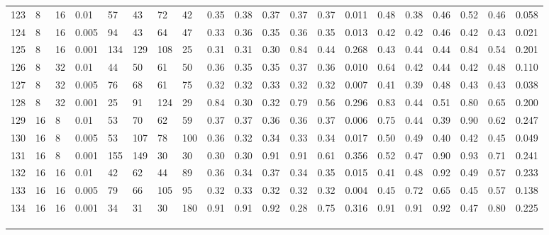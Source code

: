 \begin{landscape}
\begin{longtable}{llllllllllllllllllll}
123 & 8  & 16 & 0.01  & 57  & 43  & 72  & 42  & 0.35 & 0.38 & 0.37 & 0.37 & 0.37 & 0.011 & 0.48 & 0.38 & 0.46 & 0.52 & 0.46 & 0.058 \\
124 & 8  & 16 & 0.005 & 94  & 43  & 64  & 47  & 0.33 & 0.36 & 0.35 & 0.36 & 0.35 & 0.013 & 0.42 & 0.42 & 0.46 & 0.42 & 0.43 & 0.021 \\
125 & 8  & 16 & 0.001 & 134 & 129 & 108 & 25  & 0.31 & 0.31 & 0.30 & 0.84 & 0.44 & 0.268 & 0.43 & 0.44 & 0.44 & 0.84 & 0.54 & 0.201 \\
126 & 8  & 32 & 0.01  & 44  & 50  & 61  & 50  & 0.36 & 0.35 & 0.35 & 0.37 & 0.36 & 0.010 & 0.64 & 0.42 & 0.44 & 0.42 & 0.48 & 0.110 \\
127 & 8  & 32 & 0.005 & 76  & 68  & 61  & 75  & 0.32 & 0.32 & 0.33 & 0.32 & 0.32 & 0.007 & 0.41 & 0.39 & 0.48 & 0.43 & 0.43 & 0.038 \\
128 & 8  & 32 & 0.001 & 25  & 91  & 124 & 29  & 0.84 & 0.30 & 0.32 & 0.79 & 0.56 & 0.296 & 0.83 & 0.44 & 0.51 & 0.80 & 0.65 & 0.200 \\
129 & 16 & 8  & 0.01  & 53  & 70  & 62  & 59  & 0.37 & 0.37 & 0.36 & 0.36 & 0.37 & 0.006 & 0.75 & 0.44 & 0.39 & 0.90 & 0.62 & 0.247 \\
130 & 16 & 8  & 0.005 & 53  & 107 & 78  & 100 & 0.36 & 0.32 & 0.34 & 0.33 & 0.34 & 0.017 & 0.50 & 0.49 & 0.40 & 0.42 & 0.45 & 0.049 \\
131 & 16 & 8  & 0.001 & 155 & 149 & 30  & 30  & 0.30 & 0.30 & 0.91 & 0.91 & 0.61 & 0.356 & 0.52 & 0.47 & 0.90 & 0.93 & 0.71 & 0.241 \\
132 & 16 & 16 & 0.01  & 42  & 62  & 44  & 89  & 0.36 & 0.34 & 0.37 & 0.34 & 0.35 & 0.015 & 0.41 & 0.48 & 0.92 & 0.49 & 0.57 & 0.233 \\
133 & 16 & 16 & 0.005 & 79  & 66  & 105 & 95  & 0.32 & 0.33 & 0.32 & 0.32 & 0.32 & 0.004 & 0.45 & 0.72 & 0.65 & 0.45 & 0.57 & 0.138 \\
134 & 16 & 16 & 0.001 & 34  & 31  & 30  & 180 & 0.91 & 0.91 & 0.92 & 0.28 & 0.75 & 0.316 & 0.91 & 0.91 & 0.92 & 0.47 & 0.80 & 0.225 \\
    &    &    &       &     &     &     &     &      &      &      &      &      &       &      &      &      &      &      &       \\
    &    &    &       &     &     &     &     &      &      &      &      &      &       &      &      &      &      &      &       \\
    &    &    &       &     &     &     &     &      &      &      &      &      &       &      &      &      &      &      &       \\

\end{longtable}
\end{landscape}

